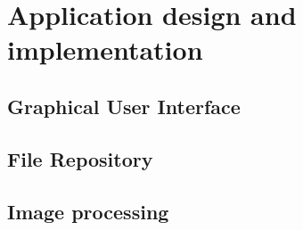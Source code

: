 \chapter{Application design and implementation}
\label{chap:design}

\section{Graphical User Interface}
\label{sec:designsec1}

\section{File Repository}
\label{sec:designsec2}

\section{Image processing}
\label{sec:designsec3}
